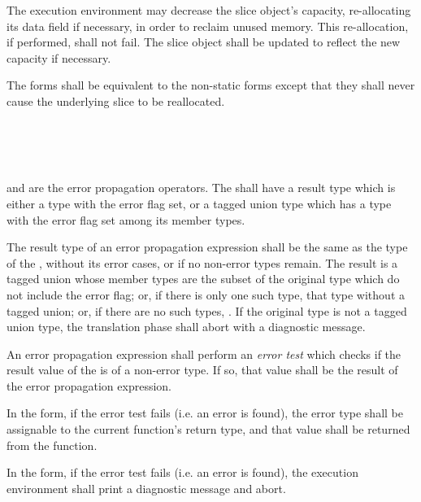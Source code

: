 \specsubsubitem
The execution environment may decrease the slice object's capacity,
re-allocating its data field if necessary, in order to reclaim unused memory.
This re-allocation, if performed, shall not fail. The slice object shall be
updated to reflect the new capacity if necessary.

\specsubsubitem
The  forms shall be equivalent to the non-static forms except
that they shall never cause the underlying slice to be reallocated.


\begin{grammar}
 \\
	  \\
	 \terminal{!} \\
\end{grammar}

\specsubsubitem
{} and \terminal{!} are the error propagation operators. The
 shall have a result type which is either a
type with the error flag set, or a tagged union type which has a type with the
error flag set among its member types.

\specsubsubitem
The result type of an error propagation expression shall be the same as the
type of the , without its error cases, or
 if no non-error types remain. The result is a tagged union
whose member types are the subset of the original type which do not include the
error flag; or, if there is only one such type, that type without a tagged
union; or, if there are no such types, . If the original type is
not a tagged union type, the translation phase shall abort with a diagnostic
message.

\specsubsubitem
An error propagation expression shall perform an \textit{error test} which
checks if the result value of the  is of a
non-error type. If so, that value shall be the result of the error propagation
expression.

\specsubsubitem
In the  form, if the error test fails (i.e. an error is found), the
error type shall be assignable to the current function's return type, and that
value shall be returned from the function.

\specsubsubitem
In the \terminal{!} form, if the error test fails (i.e. an error is found), the
execution environment shall print a diagnostic message and abort.

